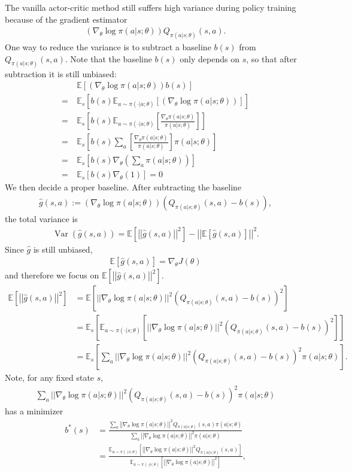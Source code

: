 \documentclass[12pt,oneside]{article}
\newcommand{\norm}[1]{\left|\left|#1\right|\right|}
\newcommand{\BE}[0]{\mathbb{E}}
\newcommand{\ali}[1]{\begin{align*}#1\end{align*}}
\DeclareMathOperator{\Var}{Var}
\theoremstyle{plain}
\theoremstyle{remark}
\begin{document}
The vanilla actor-critic method still suffers high variance during policy training because of the gradient estimator
\ali{   (\nabla_\theta \log \pi(a|s;\theta)) Q_{\pi(a|s;\theta)}(s, a).}
One way to reduce the variance is to subtract a baseline $b(s)$ from $Q_{\pi(a|s;\theta)}(s, a)$. Note that the baseline $b(s)$ only depends on $s$, so that after subtraction it is still unbiased:
\ali{ &\BE \left[(\nabla_\theta \log \pi(a|s;\theta)) b(s) \right] \\
= \ &\BE_s \left[b(s) \BE_{a \sim \pi(\cdot|a;\theta)}  \left[(\nabla_\theta \log \pi(a|s;\theta))  \right] \right] \\
= \ &\BE_s \left[b(s) \BE_{a \sim \pi(\cdot|a;\theta)}  \left[\frac{\nabla_\theta \pi(a|s;\theta)}{ \pi(a|s;\theta)} \right] \right] \\
= \ &\BE_s \left[b(s) \sum_a \left[\frac{\nabla_\theta \pi(a|s;\theta)}{ \pi(a|s;\theta)} \right] \pi(a|s;\theta) \right] \\
= \ &\BE_s \left[b(s) \nabla_\theta \left(\sum_a \pi(a|s;\theta)\right) \right] \\
= \ &\BE_s \left[ b(s) \nabla_\theta (1) \right] = 0}
We then decide a proper baseline. After subtracting the baseline
\ali{\hat{g}(s,a) := (\nabla_\theta \log \pi(a|s;\theta)) (Q_{\pi(a|s;\theta)}(s, a) - b(s)),}
the total variance is 
\ali{\Var(\hat{g}(s,a)) = \BE \left[ \norm{\hat{g}(s,a)}^2 \right] - \norm{\BE \left[ \hat{g}(s,a) \right]}^2.}
Since $\hat{g}$ is still unbiased, 
\ali{\BE \left[ \hat{g}(s,a) \right] = \nabla_\theta J(\theta)}
and therefore we focus on $\BE \left[ \norm{\hat{g}(s,a)}^2 \right] $.
\ali{\BE \left[ \norm{\hat{g}(s,a)}^2 \right] &= \BE \left[ \norm{\nabla_\theta \log \pi(a|s;\theta)}^2 (Q_{\pi(a|s;\theta)}(s, a) - b(s))^2 \right] \\
 &= \BE_s \left[\BE_{a \sim \pi(\cdot|s;\theta)} \left[ \norm{\nabla_\theta \log \pi(a|s;\theta)}^2 (Q_{\pi(a|s;\theta)}(s, a) - b(s))^2 \right] \right] \\
 &= \BE_s \left[\sum_a \norm{\nabla_\theta \log \pi(a|s;\theta)}^2 (Q_{\pi(a|s;\theta)}(s, a) - b(s))^2 \pi(a|s;\theta) \right].}
Note, for any fixed state $s$, 
\ali{\sum_a \norm{\nabla_\theta \log \pi(a|s;\theta)}^2 (Q_{\pi(a|s;\theta)}(s, a) - b(s))^2 \pi(a|s;\theta)}
has a minimizer 
\ali{b^*(s) &= \frac{\sum_a \norm{\nabla_\theta \log \pi(a|s;\theta)}^2 Q_{\pi(a|s;\theta)}(s, a)\pi(a|s;\theta)}{\sum_a \norm{\nabla_\theta \log \pi(a|s;\theta)}^2 \pi(a|s;\theta)} \\
            &= \frac{\BE_{a \sim \pi(\cdot|s;\theta)} \left[ \norm{\nabla_\theta \log \pi(a|s;\theta)}^2 Q_{\pi(a|s;\theta)}(s, a) \right]}{\BE_{a \sim \pi(\cdot|s;\theta)} \left[ \norm{\nabla_\theta \log \pi(a|s;\theta)}^2 \right]},}
\end{document}
